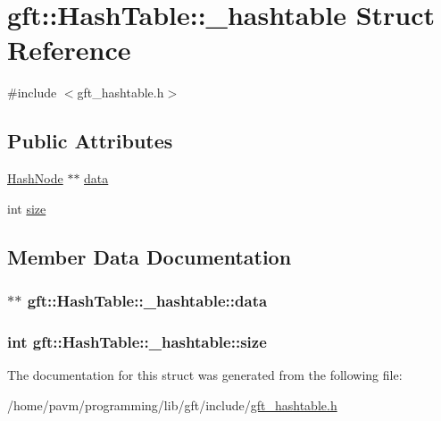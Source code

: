 \hypertarget{structgft_1_1HashTable_1_1__hashtable}{\section{gft\-:\-:Hash\-Table\-:\-:\-\_\-hashtable Struct Reference}
\label{structgft_1_1HashTable_1_1__hashtable}
}


{\ttfamily \#include $<$gft\-\_\-hashtable.\-h$>$}

\subsection*{Public Attributes}
\begin{DoxyCompactItemize}
\item 
\hyperlink{namespacegft_1_1HashTable_a4eada131a57cbf3ab87cfb50823b3613}{Hash\-Node} $\ast$$\ast$ \hyperlink{structgft_1_1HashTable_1_1__hashtable_a8ef68aae14c31a437d7e789ca2236774}{data}
\item 
int \hyperlink{structgft_1_1HashTable_1_1__hashtable_a443a09f8e31532ee0c3edf8f61d015cd}{size}
\end{DoxyCompactItemize}


\subsection{Member Data Documentation}
\hypertarget{structgft_1_1HashTable_1_1__hashtable_a8ef68aae14c31a437d7e789ca2236774}{
\subsubsection[{data}]{$\ast$$\ast$ gft\-::\-Hash\-Table\-::\-\_\-hashtable\-::data}}\label{structgft_1_1HashTable_1_1__hashtable_a8ef68aae14c31a437d7e789ca2236774}
\hypertarget{structgft_1_1HashTable_1_1__hashtable_a443a09f8e31532ee0c3edf8f61d015cd}{
\subsubsection[{size}]{\setlength{\rightskip}{0pt plus 5cm}int gft\-::\-Hash\-Table\-::\-\_\-hashtable\-::size}}\label{structgft_1_1HashTable_1_1__hashtable_a443a09f8e31532ee0c3edf8f61d015cd}


The documentation for this struct was generated from the following file\-:\begin{DoxyCompactItemize}
\item 
/home/pavm/programming/lib/gft/include/\hyperlink{gft__hashtable_8h}{gft\-\_\-hashtable.\-h}\end{DoxyCompactItemize}
